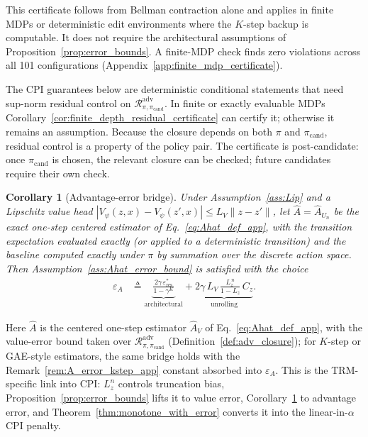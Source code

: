 \documentclass{article}
\theoremstyle{plain}
\newtheorem{corollary}[theorem]{Corollary}
\theoremstyle{definition}
\theoremstyle{remark}
\begin{document}
This certificate follows from Bellman contraction alone and applies in finite MDPs or deterministic edit environments where the $K$-step backup is computable. It does not require the architectural assumptions of Proposition~\ref{prop:error_bounds}. A finite-MDP check finds zero violations across all 101 configurations (Appendix~\ref{app:finite_mdp_certificate}).

The CPI guarantees below are deterministic conditional statements that need sup-norm residual control on $\mathcal R_{\pi,\pi_{\mathrm{cand}}}^{\mathrm{adv}}$. In finite or exactly evaluable MDPs Corollary~\ref{cor:finite_depth_residual_certificate} can certify it; otherwise it remains an assumption. Because the closure depends on both $\pi$ and $\pi_{\mathrm{cand}}$, residual control is a property of the policy pair. The certificate is post-candidate: once $\pi_{\mathrm{cand}}$ is chosen, the relevant closure can be checked; future candidates require their own check.

\begin{corollary}[Advantage-error bridge]
\label{cor:epsA_dials}
Under Assumption~\ref{ass:Lip} and a Lipschitz value head $|V_\psi(z,x)-V_\psi(z',x)|\le L_V\|z-z'\|$, let $\widehat A=\widehat A_{U_n}$ be the exact one-step centered estimator of Eq.~\eqref{eq:Ahat_def_app}, with the transition expectation evaluated exactly (or applied to a deterministic transition) and the baseline computed exactly under $\pi$ by summation over the discrete action space. Then Assumption~\ref{ass:Ahat_error_bound} is satisfied with the choice
\begin{align}
\varepsilon_A
&\triangleq
\underbrace{\frac{2\gamma\,\varepsilon_{\mathrm{res}}^*}{1-\gamma^K}}_{\text{architectural}}
+
\underbrace{2\gamma\,L_V\,\frac{L_z^{\,n}}{1-L_z}\,C_z}_{\text{unrolling}}.
\label{eq:epsA_dials}
\end{align}
\end{corollary}

Here $\widehat A$ is the centered one-step estimator $\widehat A_V$ of Eq.~\eqref{eq:Ahat_def_app}, with the value-error bound taken over $\mathcal{R}^{\mathrm{adv}}_{\pi,\pi_{\mathrm{cand}}}$ (Definition~\ref{def:adv_closure}); for $K$-step or GAE-style estimators, the same bridge holds with the Remark~\ref{rem:A_error_kstep_app} constant absorbed into $\varepsilon_A$. This is the TRM-specific link into CPI: $L_z^n$ controls truncation bias, Proposition~\ref{prop:error_bounds} lifts it to value error, Corollary~\ref{cor:epsA_dials} to advantage error, and Theorem~\ref{thm:monotone_with_error} converts it into the linear-in-$\alpha$ CPI penalty.
\end{document}
